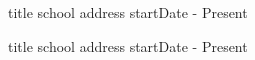 \begin{cventries}
    
  \cventry
    {title}
    {school}
    {address}
    {startDate - Present}{}

    \vspace{-.5\baselineskip}
  \cventry
    {title}
    {school}
    {address}
    {startDate - Present}{}

    \vspace{-.5\baselineskip}
\end{cventries}